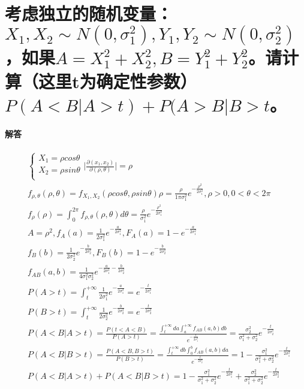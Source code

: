 \documentclass[UTF8]{ctexart}
\begin{document}
\section{考虑独立的随机变量：$X_1,X_2\sim N(0,\sigma_1^2),Y_1,Y_2\sim N(0,\sigma_2^2)$，如果$A=X_1^2+X_2^2,B=Y_1^2+Y_2^2$。请计算（这里t为确定性参数）$P(A<B\lvert A>t)+P(A>B\lvert B>t$。}
\paragraph{解答}
\begin{equation*}
\begin{aligned}
&\begin{cases}
X_1=\rho cos\theta\\
X_2=\rho sin\theta\\
\end{cases}
\lvert \frac{\partial(x_1,x_2)}{\partial(\rho,\theta)}\rvert=\rho\\
&f_{\rho,\theta}(\rho,\theta)=f_{X_1,X_2}(\rho cos\theta,\rho sin\theta)\rho=\frac{\rho}{1\pi\sigma_1^2}e^{-\frac{\rho^2}{2\sigma_1^2}},\rho>0,0<\theta<2\pi\\
&f_\rho(\rho)=\int_0^{2\pi}f_{\rho,\theta}(\rho,\theta)d\theta=\frac{\rho}{\sigma_1^2}e^{-\frac{\rho^2}{2\sigma_1^2}}\\
&A=\rho^2,f_A(a)=\frac{1}{2\sigma_1^2}e^{-\frac{a}{2\sigma_1^2}},F_A(a)=1-e^{-\frac{a}{2\sigma_1^2}}\\
&f_B(b)=\frac{1}{2\sigma_2^2}e^{-\frac{b}{2\sigma_2^2}},F_B(b)=1-e^{-\frac{b}{2\sigma_2^2}}\\
&f_{AB}(a,b)=\frac{1}{4\sigma_1^2\sigma_2^2}e^{-\frac{a}{2\sigma_1^2}-\frac{b}{2\sigma_2^2}}\\
&P(A>t)=\int_t^{+\infty}\frac{1}{2\sigma_1^2}e^{-\frac{a}{2\sigma_1^2}}=e^{-\frac{t}{2\sigma_1^2}}\\
&P(B>t)=\int_t^{+\infty}\frac{1}{2\sigma_2^2}e^{-\frac{b}{2\sigma_2^2}}=e^{-\frac{t}{2\sigma_2^2}}\\
&P(A<B\lvert A>t)=\frac{P(t<A<B)}{P(A>t)}=\frac{\int_t^{+\infty}da\int_a^{+\infty}f_{AB}(a,b)db}{e^{-\frac{t}{2\sigma_1^2}}}=\frac{\sigma_2^2}{\sigma_1^2+\sigma_2^2}e^{-\frac{t}{2\sigma_2^2}}\\
&P(A<B\lvert B>t)=\frac{P(A<B,B>t)}{P(B>t)}=\frac{\int_t^{+\infty}db\int_0^bf_{AB}(a,b)da}{e^{-\frac{t}{2\sigma_2^2}}}=1-\frac{\sigma_1^2}{\sigma_1^2+\sigma_2^2}e^{-\frac{t}{2\sigma_1^2}}\\
&P(A<B\lvert A>t)+P(A<B\lvert B>t)=1-\frac{\sigma_1^2}{\sigma_1^2+\sigma_2^2}e^{-\frac{t}{2\sigma_1^2}}+\frac{\sigma_2^2}{\sigma_1^2+\sigma_2^2}e^{-\frac{t}{2\sigma_2^2}}\\
\end{aligned}
\end{equation*}
\end{document}

